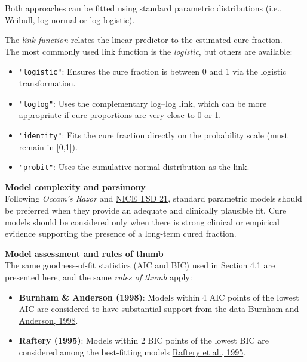 \documentclass[
]{article}
\providecommand{\tightlist}{%
  \setlength{\itemsep}{0pt}\setlength{\parskip}{0pt}}
\begin{document}
Both approaches can be fitted using standard parametric distributions
(i.e., Weibull, log-normal or log-logistic).

The \emph{link function} relates the linear predictor to the estimated
cure fraction.\\
The most commonly used link function is the \emph{logistic}, but others
are available:

\begin{itemize}
\tightlist
\item
  \texttt{"logistic"}: Ensures the cure fraction is between 0 and 1 via
  the logistic transformation.\\
\item
  \texttt{"loglog"}: Uses the complementary log--log link, which can be
  more appropriate if cure proportions are very close to 0 or 1.\\
\item
  \texttt{"identity"}: Fits the cure fraction directly on the
  probability scale (must remain in {[}0,1{]}).\\
\item
  \texttt{"probit"}: Uses the cumulative normal distribution as the
  link.
\end{itemize}

\textbf{Model complexity and parsimony}\\
Following \emph{Occam's Razor} and
\href{https://www.sheffield.ac.uk/media/34188/download?attachment}{NICE
TSD 21}, standard parametric models should be preferred when they
provide an adequate and clinically plausible fit. Cure models should be
considered only when there is strong clinical or empirical evidence
supporting the presence of a long-term cured fraction.

\textbf{Model assessment and rules of thumb}\\
The same goodness-of-fit statistics (AIC and BIC) used in Section 4.1
are presented here, and the same \emph{rules of thumb} apply:

\begin{itemize}
\tightlist
\item
  \textbf{Burnham \& Anderson (1998)}: Models within 4 AIC points of the
  lowest AIC are considered to have substantial support from the data
  \href{https://doi.org/10.1007/978-1-4757-2917-7}{Burnham and Anderson,
  1998}.\\
\item
  \textbf{Raftery (1995)}: Models within 2 BIC points of the lowest BIC
  are considered among the best-fitting models
  \href{https://doi.org/10.2307/271063}{Raftery et al., 1995}.
\end{itemize}
\end{document}
